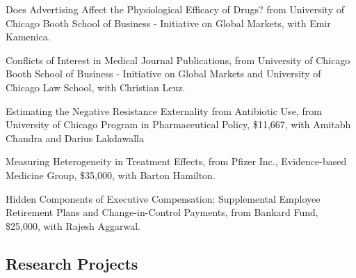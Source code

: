 \documentclass[11pt,letterpaper]{report}
\begin{document}
\begin{tablist}
        \item[2010] \tab{}Does Advertising Affect the Physiological Efficacy of Drugs? from University of Chicago Booth School of Business - Initiative on Global Markets, with Emir Kamenica.
        \item[2009] \tab{}Conflicts of Interest in Medical Journal Publications, from University of Chicago Booth School of Business - Initiative on Global Markets and University of Chicago Law School, with Christian Leuz.
        \item[2007] \tab{}Estimating the Negative Resistance Externality from Antibiotic Use, from University of Chicago Program in Pharmaceutical Policy, \$11,667, with Amitabh Chandra and Darius Lakdawalla
        \item[2007--08] \tab{}Measuring Heterogeneity in Treatment Effects, from Pfizer Inc., Evidence-based Medicine Group, \$35,000, with Barton Hamilton.
        \item[2005] \tab{}Hidden Components of Executive Compensation: Supplemental Employee Retirement Plans and Change-in-Control Payments, from Bankard Fund, \$25,000, with Rajesh Aggarwal.
        




    \end{tablist}

    \subsection*{Research Projects}
\end{document}
